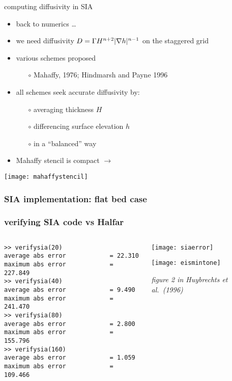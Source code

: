 \begin{frame}{computing diffusivity in SIA}

\begin{itemize}
\item back to numerics \dots
\item we need diffusivity $D = \Gamma H^{n+2} |\nabla h|^{n-1}$ on the staggered grid
\item various schemes proposed
  \begin{itemize}
  \item[$\circ$] Mahaffy, 1976; Hindmarsh and Payne 1996
  \end{itemize}
\item all schemes seek accurate diffusivity by:
  \begin{itemize}
  \item[$\circ$] averaging thickness $H$
  \item[$\circ$] differencing surface elevation $h$
  \item[$\circ$] in a ``balanced'' way
  \end{itemize}
\item Mahaffy stencil is compact $\longrightarrow$
\end{itemize}

\vspace{-10mm}
\hfill  \texttt{[image: mahaffystencil]}
\end{frame}


\begin{frame}
  \frametitle{SIA implementation: flat bed case}


\end{frame}


\begin{frame}[fragile]
\frametitle{verifying SIA code vs Halfar}
\label{slide:verifysia}

\begin{columns}
\begin{column}{0.55\textwidth}
\scriptsize
\begin{verbatim}
>> verifysia(20)
average abs error            = 22.310
maximum abs error            = 227.849
>> verifysia(40)
average abs error            = 9.490
maximum abs error            = 241.470
>> verifysia(80)
average abs error            = 2.800
maximum abs error            = 155.796
>> verifysia(160)
average abs error            = 1.059
maximum abs error            = 109.466
\end{verbatim}
\normalsize
\end{column}
\begin{column}{0.45\textwidth}

\medskip
\texttt{[image: siaerror]}

\bigskip\medskip

\texttt{[image: eismintone]}

\scriptsize \emph{figure 2 in Huybrechts et al.~(1996)}
\end{column}
\end{columns}
\end{frame}


